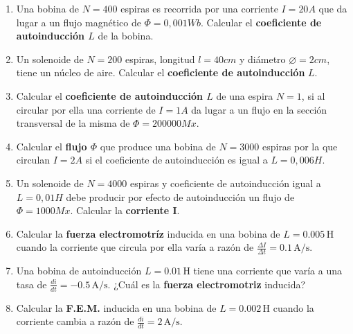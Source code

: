 \documentclass[../main]{subfiles}
\begin{document}
\begin{enumerate}
    \item Una bobina de $N=400$ espiras es recorrida por una corriente $I=20A$ que da lugar a un flujo magnético de $\Phi=0,001Wb$. Calcular el \textbf{coeficiente de autoinducción $L$} de la bobina.
    \item Un solenoide de $N=200$ espiras, longitud $l=40cm$ y diámetro $\varnothing=2cm$, tiene un núcleo de aire. Calcular el \textbf{coeficiente de autoinducción} $L$.  
    \item Calcular el \textbf{coeficiente de autoinducción $L$} de una espira $N=1$, si al circular por ella una corriente de $I=1A$ da lugar a un flujo en la sección transversal de la misma de $\Phi=200000Mx$.
    \item Calcular el \textbf{flujo $\Phi$} que produce una bobina de $N=3000$ espiras por la que circulan $I=2A$  si el coeficiente de autoinducción es igual a $L=0,006H$.
    \item Un solenoide de $N=4000$ espiras y coeficiente de autoinducción igual a $L=0,01H$ debe producir por efecto de autoinducción un flujo de $\Phi=1000Mx$. Calcular la \textbf{corriente I}. 

    \item Calcular la \textbf{fuerza electromotríz} inducida en una bobina de \( L = 0.005 \, \text{H} \) cuando la corriente que circula por ella varía a razón de \( \frac{\Delta I}{\Delta t} = 0.1\, \text{A/s} \).
    
    \item Una bobina de autoinducción \( L = 0.01 \, \text{H} \) tiene una corriente que varía a una tasa de \( \frac{di}{dt} = -0.5 \, \text{A/s} \). ¿Cuál es la \textbf{fuerza electromotriz} inducida?
    
    \item Calcular la \textbf{F.E.M.} inducida en una bobina de \( L = 0.002 \, \text{H} \) cuando la corriente cambia a razón de \( \frac{di}{dt} = 2 \, \text{A/s} \).
    

\end{enumerate}
\end{document}
